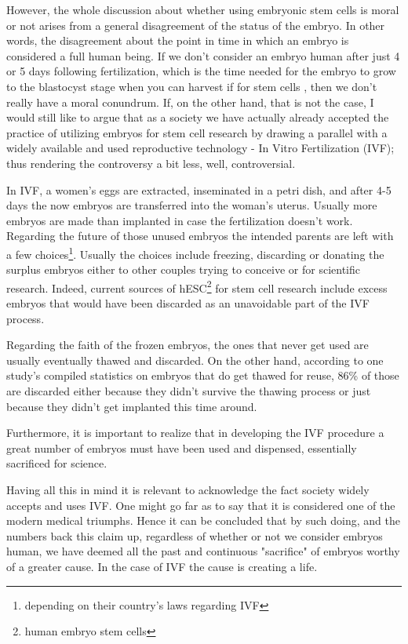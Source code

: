 \documentclass[12pt]{article} %
\begin{document}
However, the whole discussion about whether using embryonic stem cells is moral or not arises from a general disagreement of the status of the embryo. In other words, the disagreement about the point in time in which an embryo is considered a full human being. If we don't consider an embryo human after just 4 or 5 days following fertilization, which is the time needed for the embryo to grow to the blastocyst stage when you can harvest if for stem cells \cite{Landry:2016}, then we don't really have a moral conundrum. If, on the other hand, that is not the case, I would still like to argue that as a society we have actually already accepted the practice of utilizing embryos for stem cell research by drawing a parallel with a widely available and used reproductive technology - In Vitro Fertilization (IVF); thus rendering the controversy a bit less, well, controversial. 

In IVF, a women's eggs are extracted, inseminated in a petri dish, and after 4-5 days the now embryos are transferred into the woman's uterus. Usually more embryos are made than implanted in case the fertilization doesn't work. 
Regarding the future of those unused embryos the intended parents are left with a few choices\footnote{depending on their country's laws regarding IVF}. Usually the choices include freezing, discarding or donating the surplus embryos either to other couples trying to conceive or for scientific research. 
Indeed, current sources of hESC\footnote{human embryo stem cells} for stem cell research include excess embryos that would have been discarded as an unavoidable part of the IVF process\cite{Pediatrics (2012)}.

Regarding the faith of the frozen embryos, the ones that never get used are usually eventually thawed and discarded. On the other hand, according to one study's \cite{Pavone:2011} compiled statistics on embryos that do get thawed for reuse, 86\% of those are discarded either because they didn't survive the thawing process or just because they didn't get implanted this time around. 

Furthermore, it is important to realize that in developing the IVF procedure a great number of embryos must have been used and dispensed, essentially sacrificed for science. 

Having all this in mind it is relevant to acknowledge the fact society widely accepts and uses IVF. One might go far as to say that it is considered one of the modern medical triumphs. Hence it can be concluded that by such doing, and the numbers back this claim up, regardless of whether or not we consider embryos human, we have deemed all the past and continuous "sacrifice" of embryos worthy of a greater cause. In the case of IVF the cause is creating a life.
\end{document}
